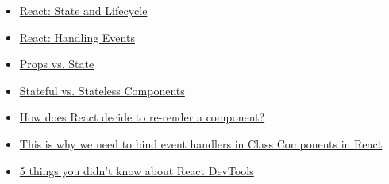 \begin{itemize}[leftmargin=*]
    \item \href{https://reactjs.org/docs/state-and-lifecycle.html}{React: State and Lifecycle}
    \item \href{https://reactjs.org/docs/handling-events.html}{React: Handling Events}
    \item \href{https://kentcdodds.com/blog/props-vs-state}{Props vs. State}
    \item \href{https://code.tutsplus.com/tutorials/stateful-vs-stateless-functional-components-in-react--cms-29541}{Stateful vs. Stateless Components}
    \item \href{http://lucybain.com/blog/2017/react-js-when-to-rerender/}{How does React decide to re-render a component?}
    \item \href{https://medium.freecodecamp.org/this-is-why-we-need-to-bind-event-handlers-in-class-components-in-react-f7ea1a6f93eb}{This is why we need to bind event handlers in Class Components in React}
    \item \href{https://blog.logrocket.com/5-things-you-didnt-know-about-react-devtools-2c6e0ef22529}{5 things you didn’t know about React DevTools}
\end{itemize}
